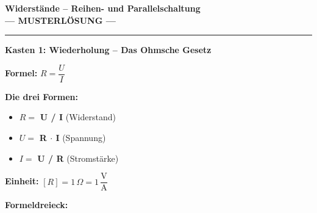 \documentclass[11pt, a4paper]{article}
\newcommand{\thema}{Widerstände – Reihen- und Parallelschaltung}
\newcommand{\lsg}[1]{\textcolor{loesung}{\textbf{#1}}}
\begin{document}

\begin{center}
    {\Large\bfseries\textcolor{fachfarbe}{\thema}}\\[0.2em]
    \textcolor{loesung}{\large\textbf{--- MUSTERLÖSUNG ---}}
\end{center}
\vspace{-0.5em}
\hrule
\vspace{0.8em}


\begin{merkkasten}
\textbf{Kasten 1: Wiederholung – Das Ohmsche Gesetz}

\vspace{0.3em}
\begin{minipage}[t]{0.55\linewidth}
\textbf{Formel:} \quad $R = \dfrac{U}{I}$

\vspace{0.5em}
\textbf{Die drei Formen:}
\begin{itemize}[leftmargin=1.5em, itemsep=2pt]
    \item $R = $ \lsg{U / I} (Widerstand)
    \item $U = $ \lsg{R $\cdot$ I} (Spannung)
    \item $I = $ \lsg{U / R} (Stromstärke)
\end{itemize}

\vspace{0.3em}
\textbf{Einheit:} $[R] = 1\,\Omega = 1\,\dfrac{\text{V}}{\text{A}}$
\end{minipage}%
\begin{minipage}[t]{0.45\linewidth}
\begin{center}
\textbf{Formeldreieck:}

\vspace{0.3em}
\end{center}
\end{minipage}
\end{merkkasten}
\end{document}
